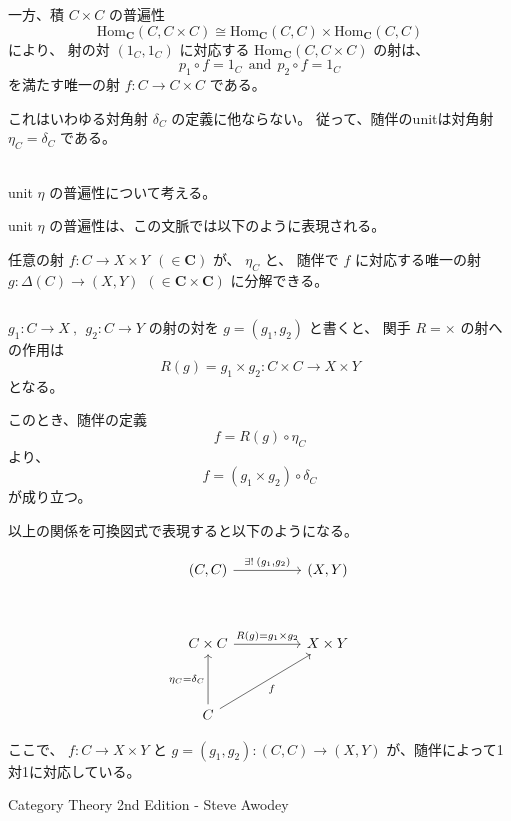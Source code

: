 \documentclass[uplatex,a4j,12pt,dvipdfmx]{jsarticle}
\begin{document}
一方、積 $C \times C$ の普遍性
$$
	\mathrm{Hom}_{\mathbf{C}}(C, C \times C)
	\cong
	\mathrm{Hom}_{\mathbf{C}}(C, C)
	\times
	\mathrm{Hom}_{\mathbf{C}}(C, C)
$$
により、
射の対
$(1_{C}, 1_{C})$
に対応する
$\mathrm{Hom}_{\mathbf{C}}(C, C \times C)$
の射は、
$$
	p_{1} \circ f = 1_{C} \ \ \text{and} \ \ p_{2} \circ f = 1_{C}
$$
を満たす唯一の射 $f: C \to C \times C$ である。

これはいわゆる対角射 $\delta_{C}$ の定義に他ならない。
従って、随伴のunitは対角射 $\eta_{C} = \delta_{C}$ である。

\ \\

unit $\eta$ の普遍性について考える。

unit $\eta$ の普遍性は、この文脈では以下のように表現される。

任意の射
$f: C \to X \times Y \ \ (\in \mathbf{C})$
が、
$\eta_{C}$ と、
随伴で $f$ に対応する唯一の射
$g: \Delta(C) \to (X,Y) \ \ (\in \mathbf{C} \times \mathbf{C})$
に分解できる。


${}$

$g_{1}: C \to X \ , \ \ g_{2}: C \to Y$
の射の対を
$g=(g_{1},g_{2})$
と書くと、
関手 $R=\times$ の射への作用は
$$
	R(g) = g_{1} \times g_{2} : C \times C \to X \times Y
$$
となる。

このとき、随伴の定義
$$
	f =  R(g) \circ \eta_{C}
$$
より、
$$
	f = (g_{1} \times g_{2}) \circ \delta_{C}
$$
が成り立つ。

以上の関係を可換図式で表現すると以下のようになる。

\[
	\begin{tikzcd}
		{(C,C)} \arrow[rr, "{\exists ! \ \! (g_{1},g_{2})}"] &  & {(X,Y)}    \\
		&  &            \\
		C \times C \arrow[rr, "R(g)=g_{1} \times g_{2}"]          &  & X \times Y \\
		&  &            \\
		C \arrow[rruu, "f"'] \arrow[uu, "\eta_{C}=\delta_{C}"]          &  &
	\end{tikzcd}
\]

ここで、
$f : C \to X \times Y$
と
$g=(g_{1},g_{2}): (C,C) \to (X,Y)$
が、随伴によって1対1に対応している。




\begin{thebibliography}{9}
	Category Theory 2nd Edition - Steve Awodey
\end{thebibliography}
\end{document}
